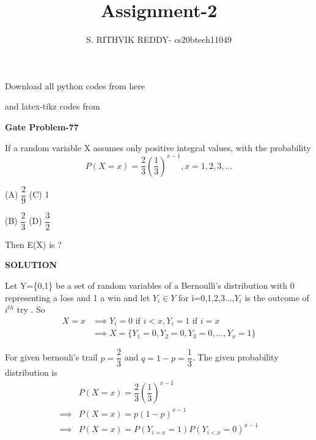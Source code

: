 \documentclass[a4paper]{article}
\title{Assignment-2}
\author{S. RITHVIK REDDY- cs20btech11049}
\date{}
\begin{document}
\maketitle
\noindent
Download all python codes from here

\begin{multicols*}{2}
\noindent
{}
    
\vspace{0.3cm}
and latex-tikz codes from  

\vspace{0.3cm}  
    
   
\vspace{0.5cm}
\textbf{Gate Problem-77}
\vspace{0.5cm}

If a random variable X assumes only positive integral values, with the probability 
$$P(X=x)=\dfrac{2}{3}\left(\dfrac{1}{3}\right)^{x-1} , x=1,2,3,...$$

(A) $\dfrac{2}{9}$ \hspace{2 cm} (C) 1

\vspace{0.5 cm}
(B) $\dfrac{2}{3}$ \hspace{2 cm} (D) $\dfrac{3}{2}$

Then E(X) is ?

\vspace{0.5cm}
\textbf{SOLUTION}
\vspace{0.5cm}

Let Y=\{0,1\} be a set of random variables of a Bernoulli's distribution with 0 representing a loss and 1 a win and let $Y_i \in Y$ for i=0,1,2,3...,$Y_i$ is the outcome of $i^{th}$ try . So 
\begin{align*}
X=x &\implies Y_i = 0 \text{ if } i<x,Y_i=1 \text{ if } i=x\\
& \implies X=\{Y_1=0,Y_2=0,Y_3=0,...,Y_x=1\}
\end{align*}


For given bernouli's trail $p=\dfrac{2}{3}$ and $q=1-p=\dfrac{1}{3}$. The given probability distribution is 
\begin{align*}
&P(X=x)=\dfrac{2}{3}\left(\dfrac{1}{3}\right)^{x-1}\\
\implies &P(X=x)=p(1-p)^{x-1}\\
\implies &P(X=x)=P(Y_{i=x}=1)P(Y_{i<x}=0)^{x-1}
\end{align*}


\end{multicols*}
\end{document}
